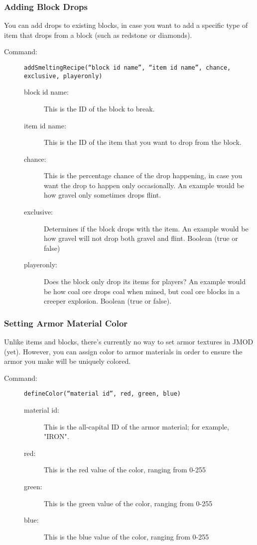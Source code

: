 \documentclass[letterpaper,titlepage,12pt]{article}
\begin{document}
\subsubsection{Adding Block Drops}

You can add drops to existing blocks, in case you want to add a specific type of item that drops from a block (such as redstone or diamonds).

\begin{description}
\item[Command:] \texttt{addSmeltingRecipe(``block id name'', ``item id name'', chance, exclusive, playeronly)}
\begin{description}
\item [block id name:] This is the ID of the block to break.
\item [item id name:] This is the ID of the item that you want to drop from the block.
\item [chance:] This is the percentage chance of the drop happening, in case you want the drop to happen only occasionally.  An example would be how gravel only sometimes drops flint.
\item [exclusive:] Determines if the block drops with the item.  An example would be how gravel will not drop both gravel and flint. Boolean (true or false)
\item [playeronly:] Does the block only drop its items for players?  An example would be how coal ore drops coal when mined, but coal ore blocks in a creeper explosion.  Boolean (true or false).
\end{description}
\end{description}

\subsubsection{Setting Armor Material Color}

Unlike items and blocks, there's currently no way to set armor textures in JMOD (yet).  However, you can assign color to armor materials in order to ensure the armor you make will be uniquely colored.

\begin{description}
\item[Command:] \texttt{defineColor(``material id'', red, green, blue)}
\begin{description}
\item [material id:] This is the all-capital ID of the armor material; for example, "IRON".
\item [red:] This is the red value of the color, ranging from 0-255
\item [green:] This is the green value of the color, ranging from 0-255
\item [blue:] This is the blue value of the color, ranging from 0-255
\end{description}
\end{description}
\end{document}
